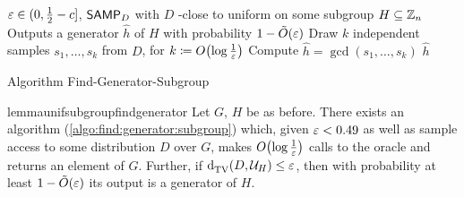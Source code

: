 \begin{algorithm}
  \begin{algorithmic}
    \Require $\varepsilon\in(0,\frac{1}{2}-c]$, ${\sf SAMP}_D$ with $D$ \eps-close to uniform on some subgroup $H\subseteq\mathbb{Z}_n$
    \Ensure Outputs a generator $\hat{h}$ of $H$ with probability $1-\tildeO{\eps}$
    \State Draw $k$ independent samples $s_1,\dots,s_k$ from $D$, for $k\eqdef\bigO{\log\frac{1}{\eps}}$
    \State Compute $\hat{h}=\gcd(s_1,\dots,s_k)$
    \State \Return $\hat{h}$
  \end{algorithmic}\caption{\label{algo:find:generator:subgroup} Algorithm {\sc Find-Generator-Subgroup}}
\end{algorithm}

\begin{restatable}{lemma}{unifsubgroupfindgenerator}\label{lemma:find:generator:subgroup}
  Let $G$, $H$ be as before. There exists an algorithm (\cref{algo:find:generator:subgroup}) which, given $\varepsilon < 0.49$ as well as sample access to some distribution $D$ over $G$, makes $\bigO{\log\frac{1}{\eps}}$ calls to the oracle and returns an element of $G$. Further, if ${\operatorname{d}_{\textrm{TV}}^{}\!\left({D, \mathcal{U}_H}\right)} \leq \varepsilon$, then with probability at least $1-\tildeO{\eps}$ its output is a generator of $H$.
\end{restatable}
